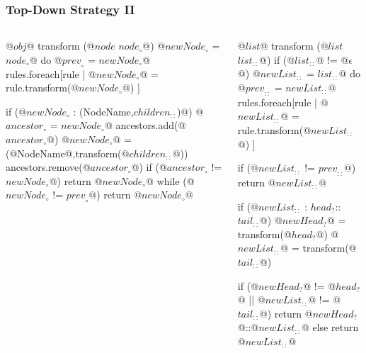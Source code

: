 \documentclass{beamer}
\newcommand{\id}[1]{\ensuremath{#1}}
\newcommand{\type}[1]{\id{#1}}
\newcommand{\obj} [1]{\ensuremath{{\id{#1}}_?}}
\newcommand{\node}[1]{\ensuremath{{\id{#1}}_\circ}}
\newcommand{\name}[1]{\textsf{#1}}
\newcommand{\lst} [1]{\ensuremath{{\id{#1}}_{::}}}
\begin{document}
\begin{frame}[fragile]
\frametitle{Top-Down Strategy II}

\begin{columns}
	
	
	\begin{PseudoCode}
@\type{obj}@ transform (@\type{node} \node{node}@)
  @\node{newNode} = \node{node}@
  do @\node{prev} = \node{newNode}@
    rules.foreach[rule |
      @\node{newNode}@ = rule.transform(@\node{newNode}@)
    ]
    
    if (@\node{newNode} : (\name{NodeName},\lst{children})@)
      @\node{ancestor} = \node{newNode}@
      ancestors.add(@\node{ancestor}@)
      @\node{newNode}@ = (@\name{NodeName}@,transform(@\lst{children}@))
      ancestors.remove(@\node{ancestor}@)
      if (@\node{ancestor} != \node{newNode}@)
        return @\node{newNode}@
  while (@\node{newNode} != \node{prev}@)
  return @\node{newNode}@
	\end{PseudoCode}
	
	
	\begin{PseudoCode}
@\type{list}@ transform (@\type{list} \lst{list}@)
  if (@\lst{list}@ != @$\epsilon$@)
    @\lst{newList} = \lst{list}@
    do @\lst{prev} = \lst{newList}@
      rules.foreach[rule |
        @\lst{newList}@ = rule.transform(@\lst{newList}@)
      ]

    if (@\lst{newList} != \lst{prev}@)
      return @\lst{newList}@
      
    if (@\lst{newList} : \obj{head}::\lst{tail}@)
      @\obj{newHead}@ = transform(@\obj{head}@)
      @\lst{newList}@ = transform(@\lst{tail}@)
      
      if (@\obj{newHead}@ != @\obj{head}@ || @\lst{newList}@ != @\lst{tail}@)
        return @\obj{newHead}@::@\lst{newList}@
      else
        return @\lst{newList}@
\end{PseudoCode}
	
\end{columns}

\end{frame}
	
\end{document}
